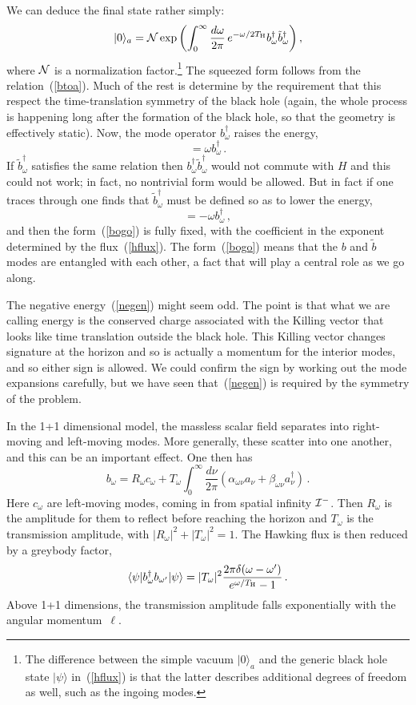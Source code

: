 \documentclass[12pt]{article}
\newcommand{\be}{\begin{equation}}
\newcommand{\ee}{\end{equation}}
\newcommand{\rmx}{\rm}
\begin{document}
We can deduce the final state rather simply:
\be
|0\rangle_a = {\cal N} \exp \left( \int _0^\infty  \frac{d\omega}{2\pi} \, e^{- \omega/2T_{\rmx H}}  b_\omega^\dagger \tilde b_\omega^\dagger \right),
\label{bogo}
\ee
where ${\cal N}$ is a normalization factor.\footnote{The difference between the simple vacuum $|0\rangle_a$ and the generic black hole state $|\psi \rangle$ in~(\ref{hflux}) is that the latter describes additional degrees of freedom as well, such as the ingoing modes.}
  The squeezed form follows from the relation~(\ref{btoa}).  Much of the rest is determine by the requirement that this respect the time-translation symmetry of the black hole (again, the whole process is happening long after the formation of the black hole, so that the geometry is effectively static).  Now, the mode operator $b_\omega^\dagger$ raises the energy,
\be
[H, b_\omega^\dagger] = \omega b_\omega^\dagger \,.
\ee
If $\tilde b_\omega^\dagger$ satisfies the same relation then  $b_\omega^\dagger \tilde b_\omega^\dagger$ would not commute with $H$ and this could not work; in fact, no nontrivial form would be allowed.  But in fact if one traces through one finds that $\tilde b_\omega^\dagger$ must be defined so as to lower the energy,
\be
[H, \tilde b_\omega^\dagger] = -\omega b_\omega^\dagger \,, \label{negen}
\ee
and then the form~(\ref{bogo}) is fully fixed, with the coefficient in the exponent determined by the flux~(\ref{hflux}).  The form~(\ref{bogo}) means that the $b$ and $\tilde b$ modes are entangled with each other, a fact that will play a central role as we go along.

The negative energy~(\ref{negen}) might seem odd.  The point is that what we are calling energy is the conserved charge associated with the Killing vector that looks like time translation outside the black hole.  This Killing vector changes signature at the horizon and so is actually a momentum for the interior modes, and so either sign is allowed.  We could confirm the sign by working out the mode expansions carefully, but we have seen that~(\ref{negen}) is required by the symmetry of the problem.

In the 1+1 dimensional model, the massless scalar field separates into right-moving and left-moving modes.  More generally, these scatter into one another, and this can be an important effect.  One then has
\be
b_\omega = R_\omega c_\omega + T_\omega \int_{0}^\infty \frac{d\nu}{2\pi}\left( \alpha_{\omega\nu} a_\nu +  \beta_{\omega\nu} a_\nu^\dagger \right)\,. \label{bca}
\ee
Here $c_\omega$ are left-moving modes, coming in from spatial infinity ${\cal I}^-$.  Then $R_\omega$ is the amplitude for them to reflect before reaching the horizon and $T_\omega$ is the transmission amplitude, with $|R_\omega|^2 + |T_\omega|^2 = 1$.  The Hawking flux is then reduced by a greybody factor,
\be
\langle \psi | b_\omega^\dagger b_{\omega'} | \psi \rangle = |T_\omega|^2 \frac{2\pi \delta(\omega-\omega')}{e^{\omega/T_{\rmx H}} - 1} \,. \label{grey}
\ee
Above 1+1 dimensions, the transmission amplitude falls exponentially with the angular momentum~$\ell$.
\end{document}
